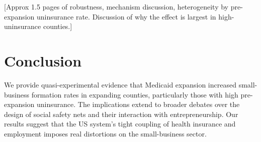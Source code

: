 \documentclass[11pt]{article}
\begin{document}
[Approx 1.5 pages of robustness, mechanism discussion, heterogeneity by pre-expansion
uninsurance rate. Discussion of why the effect is largest in high-uninsurance counties.]

\section{Conclusion}

We provide quasi-experimental evidence that Medicaid expansion increased small-business
formation rates in expanding counties, particularly those with high pre-expansion
uninsurance. The implications extend to broader debates over the design of social
safety nets and their interaction with entrepreneurship. Our results suggest that the
US system's tight coupling of health insurance and employment imposes real distortions
on the small-business sector.

% 
% 
\end{document}
